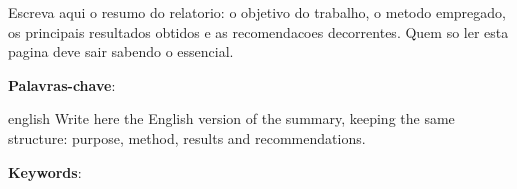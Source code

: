 %

\begin{resumo}
  Escreva aqui o resumo do relatorio: o objetivo do trabalho, o metodo
  empregado, os principais resultados obtidos e as recomendacoes
  decorrentes. Quem so ler esta pagina deve sair sabendo o essencial.

  \vspace{\onelineskip}
  \noindent
  \textbf{Palavras-chave}: \lkKeywords
\end{resumo}

\begin{resumo}[Abstract]
  \begin{otherlanguage*}{english}
    Write here the English version of the summary, keeping the same
    structure: purpose, method, results and recommendations.

    \vspace{\onelineskip}
    \noindent
    \textbf{Keywords}: \lkKeywordsEn
  \end{otherlanguage*}
\end{resumo}
